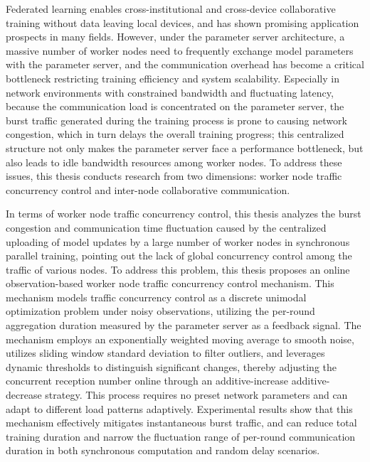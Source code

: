\documentclass[master, vlined]{DissertUESTC}
\begin{document}

	\enabstract

	Federated learning enables cross-institutional and cross-device collaborative training without data leaving local devices, and has shown promising application prospects in many fields. However, under the parameter server architecture, a massive number of worker nodes need to frequently exchange model parameters with the parameter server, and the communication overhead has become a critical bottleneck restricting training efficiency and system scalability. Especially in network environments with constrained bandwidth and fluctuating latency, because the communication load is concentrated on the parameter server, the burst traffic generated during the training process is prone to causing network congestion, which in turn delays the overall training progress; this centralized structure not only makes the parameter server face a performance bottleneck, but also leads to idle bandwidth resources among worker nodes. To address these issues, this thesis conducts research from two dimensions: worker node traffic concurrency control and inter-node collaborative communication.

	In terms of worker node traffic concurrency control, this thesis analyzes the burst congestion and communication time fluctuation caused by the centralized uploading of model updates by a large number of worker nodes in synchronous parallel training, pointing out the lack of global concurrency control among the traffic of various nodes. To address this problem, this thesis proposes an online observation-based worker node traffic concurrency control mechanism. This mechanism models traffic concurrency control as a discrete unimodal optimization problem under noisy observations, utilizing the per-round aggregation duration measured by the parameter server as a feedback signal. The mechanism employs an exponentially weighted moving average to smooth noise, utilizes sliding window standard deviation to filter outliers, and leverages dynamic thresholds to distinguish significant changes, thereby adjusting the concurrent reception number online through an additive-increase additive-decrease strategy. This process requires no preset network parameters and can adapt to different load patterns adaptively. Experimental results show that this mechanism effectively mitigates instantaneous burst traffic, and can reduce total training duration and narrow the fluctuation range of per-round communication duration in both synchronous computation and random delay scenarios.
\end{document}
